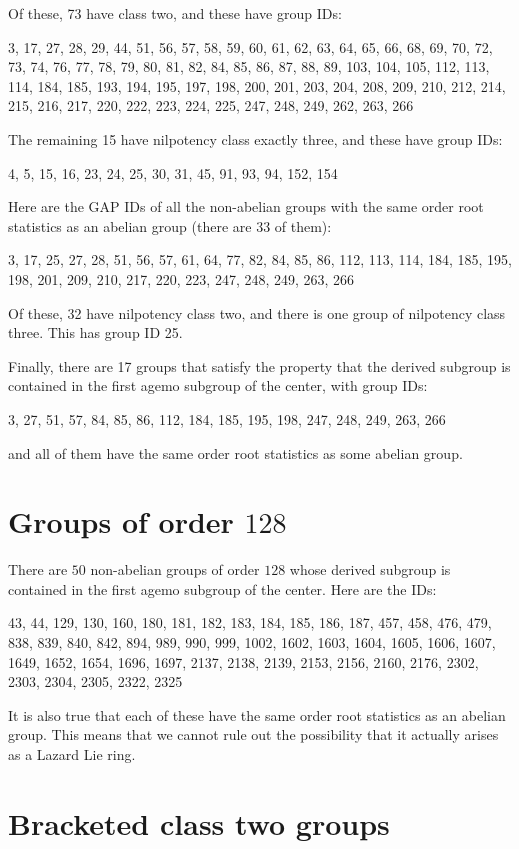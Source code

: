 \documentclass[10pt]{amsart}
\begin{document}
Of these, 73 have class two, and these have group IDs:

3, 17, 27, 28, 29, 44, 51, 56, 57, 58, 59, 60, 61, 62, 63, 64, 65, 66,
68, 69, 70, 72, 73, 74, 76, 77, 78, 79, 80, 81, 82, 84, 85, 86, 87,
88, 89, 103, 104, 105, 112, 113, 114, 184, 185, 193, 194, 195, 197,
198, 200, 201, 203, 204, 208, 209, 210, 212, 214, 215, 216, 217, 220,
222, 223, 224, 225, 247, 248, 249, 262, 263, 266

The remaining 15 have nilpotency class exactly three, and these have group IDs:

4, 5, 15, 16, 23, 24, 25, 30, 31, 45, 91, 93, 94, 152, 154

Here are the GAP IDs of all the non-abelian groups with the same order
root statistics as an abelian group (there are 33 of them):

3, 17, 25, 27, 28, 51, 56, 57, 61, 64, 77, 82, 84, 85, 86, 112, 113,
114, 184, 185, 195, 198, 201, 209, 210, 217, 220, 223, 247, 248, 249,
263, 266

Of these, 32 have nilpotency class two, and there is one group of
nilpotency class three. This has group ID 25.

Finally, there are 17 groups that satisfy the property that the
derived subgroup is contained in the first agemo subgroup of the
center, with group IDs:

3, 27, 51, 57, 84, 85, 86, 112, 184, 185, 195, 198, 247, 248, 249, 263, 266

and all of them have the same order root statistics as some abelian group.

\section{Groups of order $128$}

There are $50$ non-abelian groups of order $128$ whose derived
subgroup is contained in the first agemo subgroup of the center. Here
are the IDs:

43, 44, 129, 130, 160, 180, 181, 182, 183, 184, 185, 186, 187, 457,
458, 476, 479, 838, 839, 840, 842, 894, 989, 990, 999, 1002, 1602,
1603, 1604, 1605, 1606, 1607, 1649, 1652, 1654, 1696, 1697, 2137,
2138, 2139, 2153, 2156, 2160, 2176, 2302, 2303, 2304, 2305, 2322, 2325

It is also true that each of these have the same order root statistics
as an abelian group. This means that we cannot rule out the
possibility that it actually arises as a Lazard Lie ring.

\section{Bracketed class two groups}
\end{document}
